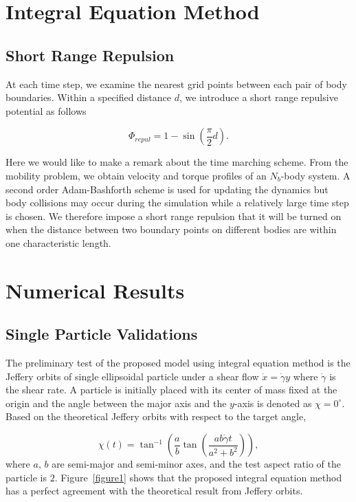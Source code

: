 \documentclass[lineno]{jfm}
\begin{document}
\section{\label{IEM}Integral Equation Method}



\subsection{Short Range Repulsion}

At each time step, we examine the nearest grid points between each pair of body  boundaries. Within a specified distance $d$, we introduce a short range repulsive potential as follows

\begin{equation}
\Phi_{repul} = 1- \sin\left(\frac{\pi}{2} d\right).
\end{equation}

Here we would like to make a remark about the time marching scheme. From the mobility problem, we obtain velocity and torque profiles of an $N_b$-body system. A second order Adam-Bashforth scheme is used for updating the dynamics but body collisions may occur during the simulation while a relatively large time step is chosen. We therefore impose a short range repulsion that it will be turned on when the distance between two boundary points on different bodies are within one characteristic length.


\section{\label{results}Numerical Results}

\subsection{Single Particle Validations}

The preliminary test of the proposed model using integral equation method is the Jeffery orbits of single ellipsoidal particle under a shear flow $\dot x = \dot\gamma y$ where $\dot\gamma$ is the shear rate. A particle is initially placed with its center of mass fixed at the origin and the angle between the major axis and the $y$-axis is denoted as $\chi = 0^\circ$. Based on the theoretical Jeffery orbits with respect to the target angle, 

\begin{equation}
\chi(t) = \tan^{-1}\left(\frac{a}{b}\tan \left(\frac{ab \dot\gamma t}{a^2+b^2}\right)\right),
\end{equation}
%
where $a$, $b$ are semi-major and semi-minor axes, and the test aspect ratio of the particle is $2$. Figure~\ref{figure1} shows that the proposed integral equation method has a perfect agreement with the theoretical result from Jeffery orbits.
\end{document}
